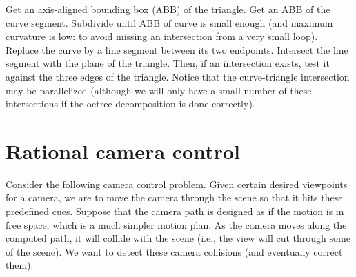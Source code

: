 \documentclass[12pt]{article}
\begin{document}
Get an axis-aligned bounding box (ABB) of the triangle.
Get an ABB of the curve segment.
Subdivide until ABB of curve is small enough (and maximum curvature is low: to avoid
missing an intersection from a very small loop).
Replace the curve by a line segment between its two endpoints.
Intersect the line segment with the plane of the triangle.
Then, if an intersection exists, test it against the three edges of the triangle.
Notice that the curve-triangle intersection may be parallelized (although we will
only have a small number of these intersections if the octree decomposition is done 
correctly).

\section{Rational camera control}

Consider the following camera control problem.
Given certain desired viewpoints for a camera, we are to move the camera through the scene
so that it hits these predefined cues.
Suppose that the camera path is designed as if the motion is in free space,
which is a much simpler motion plan.
As the camera moves along the computed path, it will collide with the scene 
(i.e., the view will cut through some of the scene).
We want to detect these camera collisions (and eventually correct them).

\end{document}

